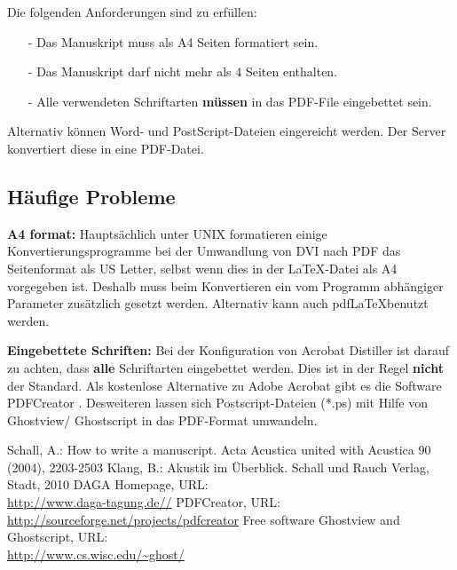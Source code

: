 \documentclass[a4paper, 10pt, twocolumn]{article}
\begin{document}
Die folgenden Anforderungen sind zu erfüllen:
\begin{itemize}
    \item[-] Das Manuskript muss als A4 Seiten formatiert sein.
    \item[-] Das Manuskript darf nicht mehr als 4 Seiten enthalten.
    \item[-] Alle verwendeten Schriftarten \textbf{müssen} in das PDF-File eingebettet sein.
\end{itemize}
Alternativ können Word- und PostScript-Dateien eingereicht werden. Der Server konvertiert diese in eine PDF-Datei.
\subsection*{Häufige Probleme}
\textbf{A4 format:} Hauptsächlich unter UNIX formatieren einige Konvertierungsprogramme bei der Umwandlung von DVI nach PDF das Seitenformat als US Letter, selbst wenn dies in der \LaTeX-Datei als A4 vorgegeben ist. Deshalb muss beim Konvertieren ein vom Programm abhängiger Parameter zusätzlich gesetzt werden.
Alternativ kann auch pdf\LaTeX benutzt werden.

\textbf{Eingebettete Schriften:} Bei der Konfiguration von Acrobat Distiller ist darauf zu achten, dass \textbf{alle} Schriftarten eingebettet werden. Dies ist in der Regel \textbf{nicht} der Standard. Als kostenlose Alternative zu Adobe Acrobat gibt es die Software PDFCreator \cite{PDFCreator}. Desweiteren lassen sich Postscript-Dateien (*.ps) mit Hilfe von Ghostview/ Ghostscript \cite{Ghostware} in das PDF-Format umwandeln.
\begin{thebibliography}{5}
Schall, A.: How to write a manuscript. Acta Acustica united with
Acustica 90 (2004), 2203-2503
Klang, B.: Akustik im Überblick. Schall und Rauch Verlag, Stadt,
2010
DAGA Homepage, URL:\\
\url{http://www.daga-tagung.de//}
PDFCreator, URL:\\
\url{http://sourceforge.net/projects/pdfcreator}
Free software Ghostview and Ghostscript, URL:\\
\url{http://www.cs.wisc.edu/~ghost/}
\end{thebibliography}
\end{document}

